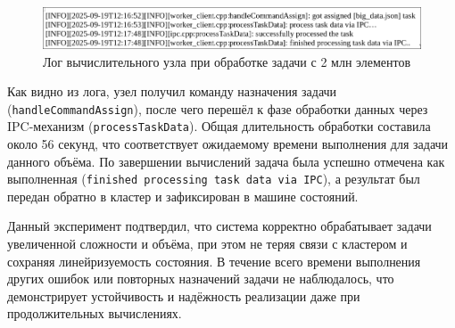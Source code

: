 \begin{figure}[h!]
    \centering
    \includegraphics[width=0.95\linewidth]{inc/worker-big-data.png}
    \caption{Лог вычислительного узла при обработке задачи с 2 млн элементов}
    \label{fig:worker_bigdata}
\end{figure}

Как видно из лога, узел получил команду назначения задачи
(\texttt{handleCommandAssign}), после чего перешёл к фазе обработки данных через
IPC-механизм (\texttt{processTaskData}). Общая длительность обработки составила
около 56 секунд, что соответствует ожидаемому времени выполнения для задачи
данного объёма. По завершении вычислений задача была успешно отмечена как
выполненная (\texttt{finished processing task data via IPC}), а результат был
передан обратно в кластер и зафиксирован в машине состояний.

Данный эксперимент подтвердил, что система корректно обрабатывает задачи
увеличенной сложности и объёма, при этом не теряя связи с кластером и
сохраняя линейризуемость состояния. В течение всего времени выполнения других
ошибок или повторных назначений задачи не наблюдалось, что демонстрирует
устойчивость и надёжность реализации даже при продолжительных вычислениях.
